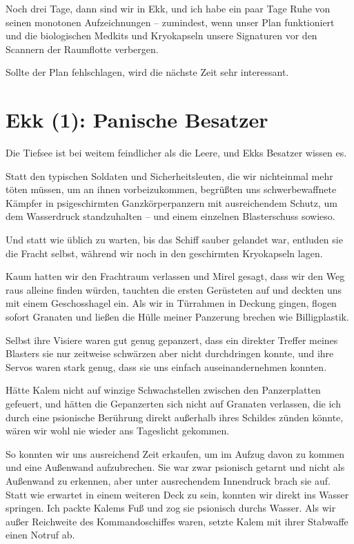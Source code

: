 \documentclass[11pt]{article}
\begin{document}
Noch drei Tage, dann sind wir in Ekk, und ich habe ein paar Tage Ruhe
von seinen monotonen Aufzeichnungen -- zumindest, wenn unser Plan
funktioniert und die biologischen Medkits und Kryokapseln unsere
Signaturen vor den Scannern der Raumflotte verbergen.

Sollte der Plan fehlschlagen, wird die nächste Zeit sehr interessant.

\section{Ekk (1): Panische Besatzer}

Die Tiefsee ist bei weitem feindlicher als die Leere, und Ekks Besatzer
wissen es.

Statt den typischen Soldaten und Sicherheitsleuten, die wir nichteinmal
mehr töten müssen, um an ihnen vorbeizukommen, begrüßten uns
schwerbewaffnete Kämpfer in psigeschirmten Ganzkörperpanzern mit
ausreichendem Schutz, um dem Wasserdruck standzuhalten -- und einem
einzelnen Blasterschuss sowieso.

Und statt wie üblich zu warten, bis das Schiff sauber gelandet war,
entluden sie die Fracht selbst, während wir noch in den geschirmten
Kryokapseln lagen.

Kaum hatten wir den Frachtraum verlassen und Mirel gesagt, dass wir den
Weg raus alleine finden würden, tauchten die ersten Gerüsteten auf und
deckten uns mit einem Geschosshagel ein. Als wir in Türrahmen in Deckung
gingen, flogen sofort Granaten und ließen die Hülle meiner Panzerung
brechen wie Billigplastik.

Selbst ihre Visiere waren gut genug gepanzert, dass ein direkter Treffer
meines Blasters sie nur zeitweise schwärzen aber nicht durchdringen
konnte, und ihre Servos waren stark genug, dass sie uns einfach
auseinandernehmen konnten.

Hätte Kalem nicht auf winzige Schwachstellen zwischen den Panzerplatten
gefeuert, und hätten die Gepanzerten sich nicht auf Granaten verlassen,
die ich durch eine psionische Berührung direkt außerhalb ihres Schildes
zünden könnte, wären wir wohl nie wieder ans Tageslicht gekommen.

So konnten wir uns ausreichend Zeit erkaufen, um im Aufzug davon zu
kommen und eine Außenwand aufzubrechen. Sie war zwar psionisch getarnt
und nicht als Außenwand zu erkennen, aber unter ausrechendem Innendruck
brach sie auf. Statt wie erwartet in einem weiteren Deck zu sein,
konnten wir direkt ins Wasser springen. Ich packte Kalems Fuß und zog
sie psionisch durchs Wasser. Als wir außer Reichweite des
Kommandoschiffes waren, setzte Kalem mit ihrer Stabwaffe einen Notruf
ab.
\end{document}
